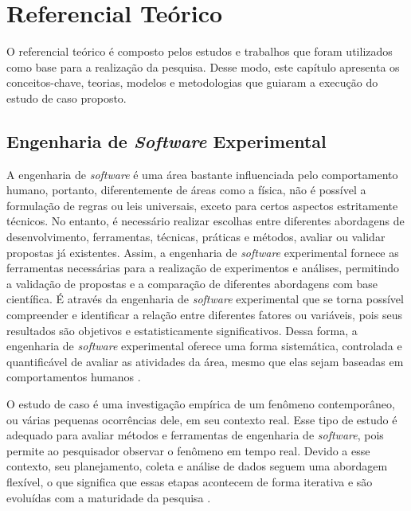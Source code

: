 \chapter[Referencial Teórico]{Referencial Teórico}
\label{chap:referencial-teorico}

O referencial teórico é composto pelos estudos e trabalhos que foram utilizados como base para a realização da pesquisa. Desse modo, este capítulo apresenta os conceitos-chave, teorias, modelos e metodologias que guiaram a execução do estudo de caso proposto.

\section{Engenharia de \textit{Software} Experimental}
\label{sec:engenharia-software-experimental}

A engenharia de \textit{software} é uma área bastante influenciada pelo comportamento humano, portanto, diferentemente de áreas como a física, não é possível a formulação de regras ou leis universais, exceto para certos aspectos estritamente técnicos. No entanto, é necessário realizar escolhas entre diferentes abordagens de desenvolvimento, ferramentas, técnicas, práticas e métodos, avaliar ou validar propostas já existentes. Assim, a engenharia de \textit{software} experimental fornece as ferramentas necessárias para a realização de experimentos e análises, permitindo a validação de propostas e a comparação de diferentes abordagens com base científica. É através da engenharia de \textit{software} experimental que se torna possível compreender e identificar a relação entre diferentes fatores ou variáveis, pois seus resultados são objetivos e estatisticamente significativos. Dessa forma, a engenharia de \textit{software} experimental oferece uma forma sistemática, controlada e quantificável de avaliar as atividades da área, mesmo que elas sejam baseadas em comportamentos humanos \cite{Wohlin2024}.

O estudo de caso é uma investigação empírica de um fenômeno contemporâneo, ou várias pequenas ocorrências dele, em seu contexto real. Esse tipo de estudo é adequado para avaliar métodos e ferramentas de engenharia de \textit{software}, pois permite ao pesquisador observar o fenômeno em tempo real. Devido a esse contexto, seu planejamento, coleta e análise de dados seguem uma abordagem flexível, o que significa que essas etapas acontecem de forma iterativa e são evoluídas com a maturidade da pesquisa \cite{Wohlin2024}.

